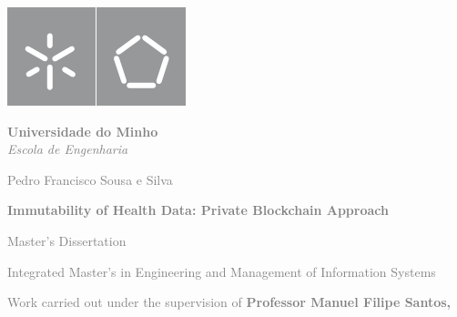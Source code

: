 \begin{titlepage}
\begin{center}

    \begin{minipage}{0.3\textwidth}
        \centering
        \includegraphics[width=\textwidth]{assets/title/gray-symbol.png} 
        
        \vspace{0.5cm}

        \raggedright
        \textcolor{gray}{\textbf{Universidade do Minho}}\\
        \textcolor{gray}{\textit{Escola de Engenharia}} 

        \vspace{3cm}
        \begin{adjustwidth}{0cm}{-2cm}
        \textcolor{gray}{Pedro Francisco Sousa e Silva}
        \end{adjustwidth}
        
        \vspace{0.5cm}
        \begin{adjustwidth}{0cm}{-2cm}
        \textcolor{gray}{\textbf{Immutability of Health Data: Private Blockchain Approach}}
        \end{adjustwidth}
        
        \vspace{4cm}
        \begin{adjustwidth}{0cm}{-2cm}
        \textcolor{gray}{Master's Dissertation}
        \end{adjustwidth}
        
        \begin{adjustwidth}{0cm}{-2cm}
        \textcolor{gray}{Integrated Master's in Engineering and Management of Information Systems}
        \end{adjustwidth}
        \vspace{2cm}
        \begin{adjustwidth}{0cm}{-2cm}
        \textcolor{gray}{Work carried out under the supervision of
        \textbf{Professor Manuel Filipe Santos,}}
        \end{adjustwidth}
        

\end{minipage}
\end{center}
\end{titlepage}
